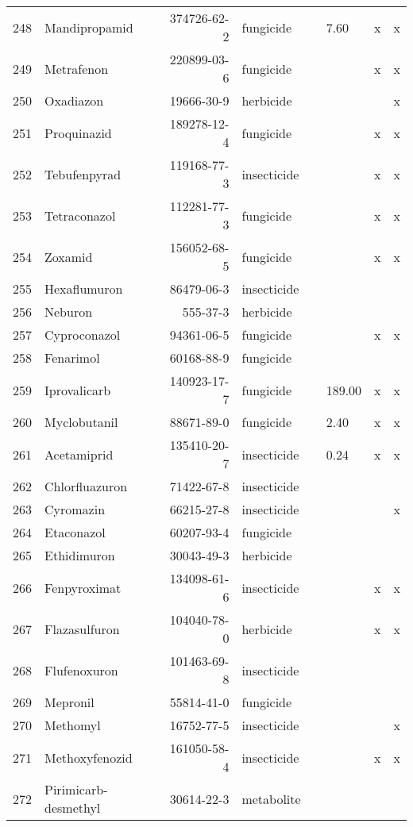 \begin{longtable}{lp{4cm}rlp{1cm}p{1.5cm}p{1.5cm}p{1cm}}
  248 & Mandipropamid & 374726-62-2 & fungicide &  & 7.60 & x & x \\ 
  249 & Metrafenon & 220899-03-6 & fungicide &  &  & x & x \\ 
  250 & Oxadiazon & 19666-30-9 & herbicide &  &  &  & x \\ 
  251 & Proquinazid & 189278-12-4 & fungicide &  &  & x & x \\ 
  252 & Tebufenpyrad & 119168-77-3 & insecticide &  &  & x & x \\ 
  253 & Tetraconazol & 112281-77-3 & fungicide &  &  & x & x \\ 
  254 & Zoxamid & 156052-68-5 & fungicide &  &  & x & x \\ 
  255 & Hexaflumuron & 86479-06-3 & insecticide &  &  &  &  \\ 
  256 & Neburon & 555-37-3 & herbicide &  &  &  &  \\ 
  257 & Cyproconazol & 94361-06-5 & fungicide &  &  & x & x \\ 
  258 & Fenarimol & 60168-88-9 & fungicide &  &  &  &  \\ 
  259 & Iprovalicarb & 140923-17-7 & fungicide &  & 189.00 & x & x \\ 
  260 & Myclobutanil & 88671-89-0 & fungicide &  & 2.40 & x & x \\ 
  261 & Acetamiprid & 135410-20-7 & insecticide &  & 0.24 & x & x \\ 
  262 & Chlorfluazuron & 71422-67-8 & insecticide &  &  &  &  \\ 
  263 & Cyromazin & 66215-27-8 & insecticide &  &  &  & x \\ 
  264 & Etaconazol & 60207-93-4 & fungicide &  &  &  &  \\ 
  265 & Ethidimuron & 30043-49-3 & herbicide &  &  &  &  \\ 
  266 & Fenpyroximat & 134098-61-6 & insecticide &  &  & x & x \\ 
  267 & Flazasulfuron & 104040-78-0 & herbicide &  &  & x & x \\ 
  268 & Flufenoxuron & 101463-69-8 & insecticide &  &  &  &  \\ 
  269 & Mepronil & 55814-41-0 & fungicide &  &  &  &  \\ 
  270 & Methomyl & 16752-77-5 & insecticide &  &  &  & x \\ 
  271 & Methoxyfenozid & 161050-58-4 & insecticide &  &  & x & x \\ 
  272 & Pirimicarb-desmethyl & 30614-22-3 & metabolite &  &  &  &  \\ 

\end{longtable}
